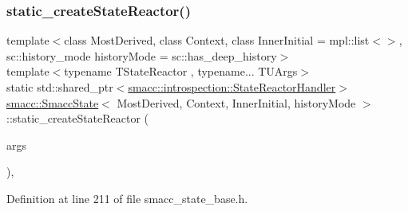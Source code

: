 \subsubsection{\texorpdfstring{static\+\_\+create\+State\+Reactor()}{static\_createStateReactor()}}
{\footnotesize\ttfamily template$<$class Most\+Derived, class Context, class Inner\+Initial = mpl\+::list$<$$>$, sc\+::history\+\_\+mode history\+Mode = sc\+::has\+\_\+deep\+\_\+history$>$ \\
template$<$typename T\+State\+Reactor , typename... T\+U\+Args$>$ \\
static std\+::shared\+\_\+ptr$<$\hyperlink{classsmacc_1_1introspection_1_1StateReactorHandler}{smacc\+::introspection\+::\+State\+Reactor\+Handler}$>$ \hyperlink{classsmacc_1_1SmaccState}{smacc\+::\+Smacc\+State}$<$ Most\+Derived, Context, Inner\+Initial, history\+Mode $>$\+::static\+\_\+create\+State\+Reactor (\begin{DoxyParamCaption}\item[{T\+U\+Args...}]{args }\end{DoxyParamCaption})\hspace{0.3cm}{\ttfamily [inline]}, {\ttfamily [static]}}



Definition at line 211 of file smacc\+\_\+state\+\_\+base.\+h.


